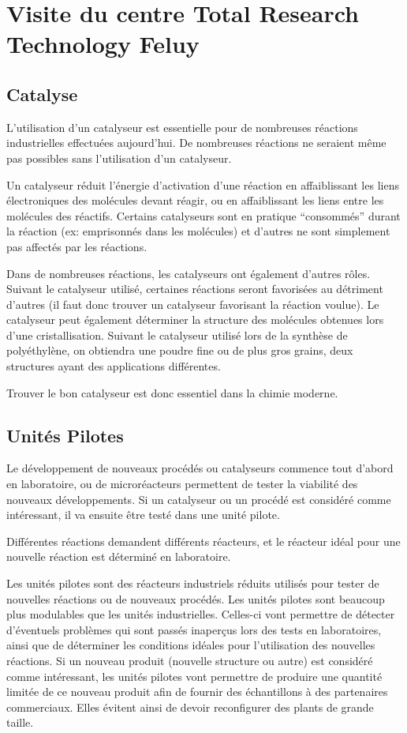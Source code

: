 \documentclass[a4paper, oneside, 12pt]{article}
\begin{document}
\section{Visite du centre Total Research Technology Feluy}

\subsection{Catalyse}
\label{subsec:catalyse}

L'utilisation d'un catalyseur est essentielle pour de nombreuses réactions industrielles 
effectuées aujourd'hui. De nombreuses réactions ne seraient même pas possibles sans 
l'utilisation d'un catalyseur.
 
Un catalyseur réduit l'énergie d'activation d'une réaction en affaiblissant les liens
électroniques des molécules devant réagir, ou en affaiblissant les liens entre les 
molécules des réactifs. Certains catalyseurs sont en pratique ``consommés'' durant 
la réaction (ex: emprisonnés dans les molécules) et d'autres ne sont simplement pas 
affectés par les réactions. 

Dans de nombreuses réactions, les catalyseurs ont également d'autres rôles. 
Suivant le catalyseur utilisé, certaines réactions seront favorisées au détriment 
d'autres (il faut donc trouver un catalyseur favorisant la réaction voulue). 
Le catalyseur peut également déterminer la structure des molécules obtenues lors 
d'une cristallisation. Suivant le catalyseur utilisé lors de la synthèse de polyéthylène,
on obtiendra une poudre fine ou de plus gros grains,
deux structures ayant des applications différentes.
 
Trouver le bon catalyseur est donc essentiel dans la chimie moderne.
 
\subsection{Unités Pilotes}
 
Le développement de nouveaux procédés ou catalyseurs commence tout d'abord en laboratoire,
ou de microréacteurs permettent de tester la viabilité des nouveaux développements.
Si un catalyseur ou un procédé est considéré comme intéressant,
il va ensuite être testé dans une unité pilote. 

Différentes réactions demandent différents réacteurs,
et le réacteur idéal pour une nouvelle réaction est déterminé en laboratoire.
 
Les unités pilotes sont des réacteurs industriels réduits utilisés pour tester de
nouvelles réactions ou de nouveaux procédés. Les unités pilotes sont beaucoup plus
modulables que les unités industrielles. Celles-ci vont permettre de détecter
d'éventuels problèmes qui sont passés inaperçus lors des tests en laboratoires,
ainsi que de déterminer les conditions idéales pour l'utilisation des nouvelles réactions.
Si un nouveau produit (nouvelle structure ou autre) est considéré comme intéressant,
les unités pilotes vont permettre de produire une quantité limitée de ce nouveau
produit afin de fournir des échantillons à des partenaires commerciaux.
Elles évitent ainsi de devoir reconfigurer des plants de grande taille.
\end{document}
